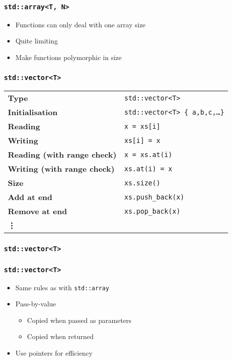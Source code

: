 \documentclass[handout]{ucll-slides}
\begin{document}
\begin{frame}
  \frametitle{\tt std::array<T, N>}
  \begin{itemize}
    \item Functions can only deal with one array size
    \item Quite limiting
    \item Make functions polymorphic in size
  \end{itemize}
\end{frame}

\begin{frame}
  \frametitle{\tt std::vector<T>}
  \begin{center}
    \begin{tabular}{ll}
      \bf Type & {\tt std::vector<T>} \\[2mm]
      \bf Initialisation & {\tt std::vector<T> \{ a,b,c,\dots \}} \\[2mm]
      \bf Reading & {\tt x = xs[i]} \\[2mm]
      \bf Writing & {\tt xs[i] = x} \\[2mm]
      \bf Reading (with range check) & {\tt x = xs.at(i)} \\[2mm]
      \bf Writing (with range check) & {\tt xs.at(i) = x} \\[2mm]
      \bf Size & {\tt xs.size()} \\[2mm]
      \bf Add at end & {\tt xs.push\_back(x)} \\[2mm]
      \bf Remove at end & {\tt xs.pop\_back(x)} \\[2mm]
      \bf \vdots
    \end{tabular}
  \end{center}
\end{frame}

\begin{frame}
  \frametitle{\tt std::vector<T>}
\end{frame}

\begin{frame}
  \frametitle{\tt std::vector<T>}
  \begin{itemize}
    \item Same rules as with {\tt std::array}
    \item Pass-by-value
          \begin{itemize}
            \item Copied when passed as parameters \cake
            \item Copied when returned \cake
          \end{itemize}
    \item Use pointers for efficiency
  \end{itemize}
\end{frame}
\end{document}
